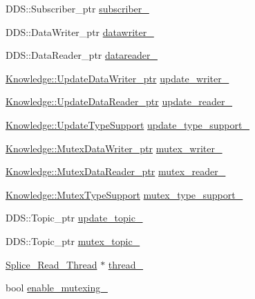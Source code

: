 \begin{DoxyCompactItemize}
DDS::Subscriber\_\-ptr \hyperlink{classMadara_1_1Transport_1_1Splice__DDS__Transport_a242a524e861f25b099e02dc946aa8d77}{subscriber\_\-}
\item 
DDS::DataWriter\_\-ptr \hyperlink{classMadara_1_1Transport_1_1Splice__DDS__Transport_ac89ba92fdf1d66d721f8d55a23f1dc62}{datawriter\_\-}
\item 
DDS::DataReader\_\-ptr \hyperlink{classMadara_1_1Transport_1_1Splice__DDS__Transport_aabe88c57b8967d6d3d0d042a519d40aa}{datareader\_\-}
\item 
\hyperlink{classKnowledge_1_1UpdateDataWriter}{Knowledge::UpdateDataWriter\_\-ptr} \hyperlink{classMadara_1_1Transport_1_1Splice__DDS__Transport_a9908c41143bb225e672ca98e2df4c17b}{update\_\-writer\_\-}
\item 
\hyperlink{classKnowledge_1_1UpdateDataReader}{Knowledge::UpdateDataReader\_\-ptr} \hyperlink{classMadara_1_1Transport_1_1Splice__DDS__Transport_a810564431d62459ba91ffff421870b16}{update\_\-reader\_\-}
\item 
\hyperlink{classKnowledge_1_1UpdateTypeSupport}{Knowledge::UpdateTypeSupport} \hyperlink{classMadara_1_1Transport_1_1Splice__DDS__Transport_a1eb3756c4b517657ccf7048c328107ab}{update\_\-type\_\-support\_\-}
\item 
\hyperlink{classKnowledge_1_1MutexDataWriter}{Knowledge::MutexDataWriter\_\-ptr} \hyperlink{classMadara_1_1Transport_1_1Splice__DDS__Transport_a25d6d97d2481e8e6029218a44dec010c}{mutex\_\-writer\_\-}
\item 
\hyperlink{classKnowledge_1_1MutexDataReader}{Knowledge::MutexDataReader\_\-ptr} \hyperlink{classMadara_1_1Transport_1_1Splice__DDS__Transport_a977ec99be57aebd70c9ab6f9428144e0}{mutex\_\-reader\_\-}
\item 
\hyperlink{classKnowledge_1_1MutexTypeSupport}{Knowledge::MutexTypeSupport} \hyperlink{classMadara_1_1Transport_1_1Splice__DDS__Transport_ac61c1e33eb0a8c5f6a67f92ee583672b}{mutex\_\-type\_\-support\_\-}
\item 
DDS::Topic\_\-ptr \hyperlink{classMadara_1_1Transport_1_1Splice__DDS__Transport_aac03f3106cb4258452465cf6d4ddf2e3}{update\_\-topic\_\-}
\item 
DDS::Topic\_\-ptr \hyperlink{classMadara_1_1Transport_1_1Splice__DDS__Transport_a6cb70c5b92c7849b09a9145b058ddb88}{mutex\_\-topic\_\-}
\item 
\hyperlink{classMadara_1_1Transport_1_1Splice__Read__Thread}{Splice\_\-Read\_\-Thread} $\ast$ \hyperlink{classMadara_1_1Transport_1_1Splice__DDS__Transport_a2559bf40f8ffe11ccffa1bc3bc58a849}{thread\_\-}
\item 
bool \hyperlink{classMadara_1_1Transport_1_1Splice__DDS__Transport_adc6fdc093412dd35dd39393ab46326f4}{enable\_\-mutexing\_\-}
\end{DoxyCompactItemize}
